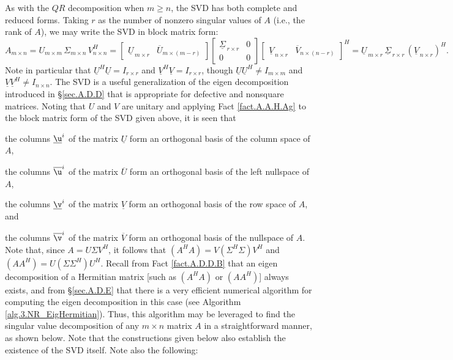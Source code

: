 As with the $QR$ decomposition when $m\ge n$, the SVD has both
complete and reduced forms.  Taking $r$ as the number of nonzero singular
values of $A$ (i.e., the rank of $A$), we may write the SVD in block
matrix form:
\begin{equation}
  A_{m\times n}=U_{m\times m} \,\Sigma_{m\times n} \,V^{H}_{n\times n} = 
  \begin{bmatrix} {\underline U}_{\,m \times r} & {\overline U}_{m \times (m-r)} \end{bmatrix}
  \begin{bmatrix} {\underline{\Sigma}}_{\,r \times r} & 0 \\ 
		  0 & 0 \end{bmatrix}
  \begin{bmatrix} {\underline V}_{\,n \times r} & {\overline V}_{n \times (n-r)} \end{bmatrix}^{H}
      ={\underline U}_{\,m\times r} \,{\underline{\Sigma}}_{\,r\times r} \,({\underline V}_{\,n\times r})^{H}. \label{SVDforms}
\end{equation}
Note in particular that $\underline U^H \underline U=I_{r\times r}$ and $\underline V^H \underline V=I_{r\times r}$,
though $\underline U \underline U^H \ne I_{m\times m}$ and $\underline V \underline V^H \ne I_{n\times n}$.
The SVD is a useful generalization of the eigen decomposition
introduced in \S \ref{sec.A.D.D} that is appropriate for defective and
nonsquare matrices.  Noting that $U$ and $V$ are unitary and applying
Fact \ref{fact.A.A.H.Ag} to the block matrix form of the SVD given
above, it is seen that
\beginmylistb
\item the columns $\underline\u^i$ of the matrix $\underline U$ form an orthogonal basis of the column space of $A$,
\item the columns $\overline\u^i$ of the matrix $\overline U$ form an orthogonal basis of the left nullspace of $A$,
\item the columns $\underline\v^i$ of the matrix $\underline V$ form an orthogonal basis of the row space of $A$, and
\item the columns $\overline\v^i$ of the matrix $\overline V$ form an orthogonal basis of the nullspace of $A$.
\endmylist
Note that, since $A=U \Sigma V^{H}$, it follows that $(A^{H}
A)=V (\Sigma^{H}\Sigma) V^{H}$ and $(A A^{H})=U (\Sigma\Sigma^{H})
U^{H}$.  Recall from Fact \ref{fact.A.D.D.B} that an eigen decomposition
of a Hermitian matrix [such as $(A^{H} A)$ or $(A
A^{H})$] always exists, and from \S \ref{sec.A.D.E} that there is a very efficient numerical algorithm for
computing the eigen decomposition in this case (see Algorithm \ref{alg.3.NR_EigHermitian}).  Thus, this algorithm may be leveraged
to find the singular value decomposition of any $m\times n$ matrix $A$
in a straightforward manner, as shown below.  Note that the
constructions given below also establish the existence of the SVD
itself.  Note also the following:


